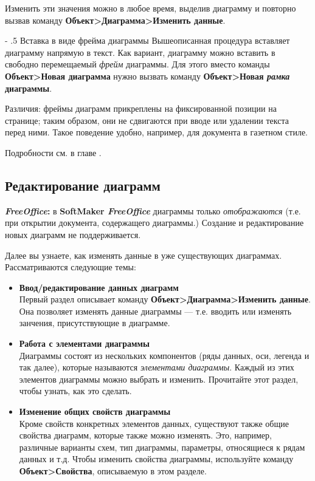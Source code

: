 ﻿\documentclass[a4paper,10pt]{article}
\makeatletter
\renewcommand\paragraph{%
   \@startsection{paragraph}{4}{0mm}%
      {-\baselineskip}%
      {.5\baselineskip}%
      {\normalfont\normalsize\bfseries}}
\makeatother
\begin{document}
 Изменить эти значения можно в любое время, выделив диаграмму и повторно вызвав команду \textbf{Объект>Диаграмма>Изменить данные}.
 
 \paragraph{Вставка в виде фрейма диаграммы}
 Вышеописанная процедура вставляет диаграмму напрямую в текст. Как вариант, диаграмму можно вставить в свободно перемещаемый \textit{фрейм} диаграммы. Для этого вместо команды \textbf{Объект>Новая диаграмма} нужно вызвать команду \textbf{Объект>Новая \textit{рамка} диаграммы}.
 
Различия: фреймы диаграмм прикреплены на фиксированной позиции на странице; таким образом, они не сдвигаются при вводе или удалении текста перед ними. Такое поведение удобно, например, для документа в газетном стиле.

Подробности см. в главе .
 
 \subsection{Редактирование диаграмм}
 \begin{mdframed}[backgroundcolor=pink!50]
\textbf{\textit{FreeOffice}:} в \textbf{SoftMaker \textit{FreeOffice}} диаграммы только \textit{отображаются} (т.е. при открытии документа, содержащего диаграммы.) Создание и редактирование новых диаграмм не поддерживается.
\end{mdframed}

Далее вы узнаете, как изменять данные в уже существующих диаграммах. Рассматриваются следующие темы:

\begin{itemize}
 \item \textbf{Ввод/редактирование данных диаграмм}\\
 Первый раздел описывает команду \textbf{Объект>Диаграмма>Изменить данные}. Она позволяет изменять данные диаграммы — т.е. вводить или изменять занчения, присутствующие в диаграмме.
 \item \textbf{Работа с элементами диаграммы}\\
 Диаграммы состоят из нескольких компонентов (ряды данных, оси, легенда и так далее), которые называются \textit{элементами диаграммы}. Каждый из этих элементов диаграммы можно выбрать и изменить. Прочитайте этот раздел, чтобы узнать, как это сделать.
 \item \textbf{Изменение общих свойств диаграммы}\\
 Кроме свойств конкретных элементов данных, существуют также общие свойства диаграмм, которые также можно изменять. Это, например, различные варианты схем, тип диаграммы, параметры, относящиеся к рядам данных и т.д. Чтобы изменить свойства диаграммы, используйте команду \textbf{Объект>Свойства}, описываемую в этом разделе.
\end{itemize}
\end{document}
